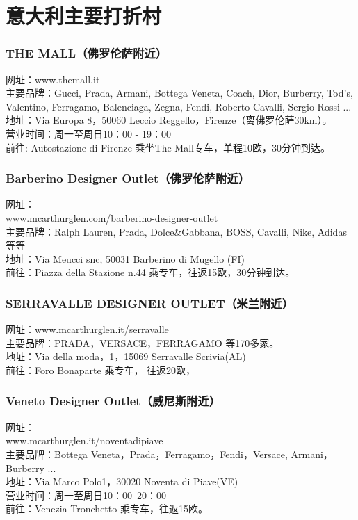 \section{意大利主要打折村}
\begin{multicols}{2}

\subsubsection{THE MALL（佛罗伦萨附近）}
\noindent 网址：www.themall.it\\
主要品牌：Gucci, Prada, Armani, Bottega Veneta, Coach, Dior, Burberry, Tod’s, Valentino, Ferragamo, Balenciaga, Zegna, Fendi, Roberto Cavalli, Sergio Rossi ...\\
地址：Via Europa 8，50060 Leccio Reggello，Firenze（离佛罗伦萨30km）。\\
营业时间：周一至周日10：00 - 19：00 \\
前往: Autostazione di Firenze 乘坐The Mall专车，单程10欧，30分钟到达。

\subsubsection{Barberino Designer Outlet（佛罗伦萨附近）}
\noindent 网址：\\
www.mcarthurglen.com/barberino-designer-outlet\\
主要品牌：Ralph Lauren, Prada, Dolce\&Gabbana, BOSS, Cavalli, Nike, Adidas 等等\\
地址：Via Meucci snc, 50031 Barberino di Mugello (FI)\\
前往：Piazza della Stazione n.44 乘专车，往返15欧，30分钟到达。
 
\subsubsection{SERRAVALLE DESIGNER OUTLET（米兰附近）}
\noindent 网址：www.mcarthurglen.it/serravalle\\
主要品牌：PRADA，VERSACE，FERRAGAMO 等170多家。\\
地址：Via della moda，1，15069 Serravalle Scrivia(AL)\\
前往：Foro Bonaparte 乘专车， 往返20欧，
 
\subsubsection{Veneto Designer Outlet（威尼斯附近）}
\noindent 网址：\\
www.mcarthurglen.it/noventadipiave \\
主要品牌：Bottega Veneta，Prada，Ferragamo，Fendi，Versace, Armani，Burberry ... \\
地址：Via Marco Polo1，30020 Noventa di Piave(VE) \\
营业时间：周一至周日10：00~20：00\\
前往：Venezia Tronchetto 乘专车，往返15欧。
 

\end{multicols}
